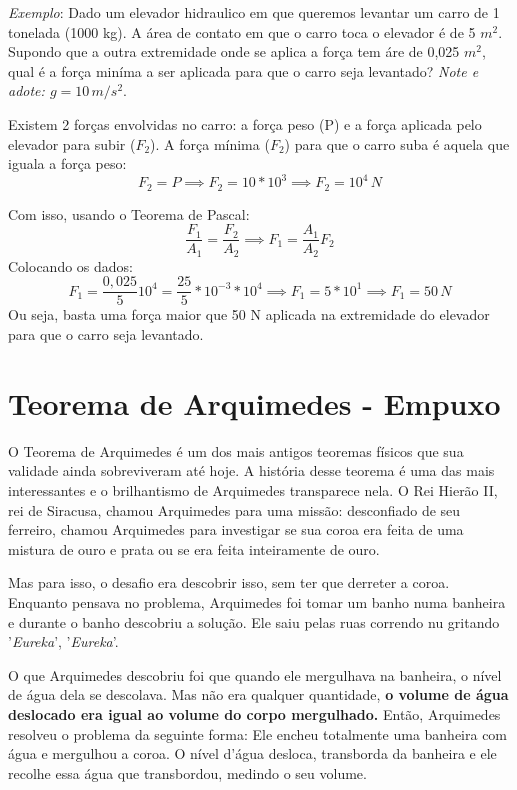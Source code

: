 \documentclass[12pt]{extarticle}
\newcommand{\<}{\langle}
\renewcommand{\>}{\rangle}
\theoremstyle{definition}
\begin{document}
\textit{Exemplo}: Dado um elevador hidraulico em que queremos levantar um carro de 1 tonelada (1000 kg). A área de contato em que o carro toca o elevador é de 5 $m^2$. Supondo que a outra extremidade onde se aplica a força tem áre de 0,025 $m^2$, qual é a força miníma a ser aplicada para que o carro seja levantado? \textit{Note e adote: $g=10\,m/s^2$}.

Existem 2 forças envolvidas no carro: a força peso (P) e a força aplicada pelo elevador para subir ($F_2$). A força mínima ($F_2$) para que o carro suba é aquela que iguala a força peso:
\begin{equation}
    F_2 = P \implies F_2 = 10*10^3 \implies F_2 = 10^4\, N
\end{equation}

Com isso, usando o Teorema de Pascal:
\begin{equation}
    \frac{F_1}{A_1} = \frac{F_2}{A_2} \implies F_1 = \frac{A_1}{A_2}F_2
\end{equation}
Colocando os dados:
\begin{equation}
    F_1 = \frac{0,025}{5}10^4 = \frac{25}{5}*10^{-3}*10^4 \implies F_1 = 5*10^1 \implies F_1 = 50\,N
\end{equation}
Ou seja, basta uma força maior que 50 N aplicada na extremidade do elevador para que o carro seja levantado.

\section{Teorema de Arquimedes - Empuxo}

O Teorema de Arquimedes é um dos mais antigos teoremas físicos que sua validade ainda sobreviveram até hoje. A história desse teorema é uma das mais interessantes e o brilhantismo de Arquimedes transparece nela. O Rei Hierão II, rei de Siracusa, chamou Arquimedes para uma missão: desconfiado de seu ferreiro, chamou Arquimedes para investigar se sua coroa era feita de uma mistura de ouro e prata ou se era feita inteiramente de ouro.

Mas para isso, o desafio era descobrir isso, sem ter que derreter a coroa. Enquanto pensava no problema, Arquimedes foi tomar um banho numa banheira e durante o banho descobriu a solução. Ele saiu pelas ruas correndo nu gritando '\textit{Eureka}', '\textit{Eureka}'.

O que Arquimedes descobriu foi que quando ele mergulhava na banheira, o nível de água dela se descolava. Mas não era qualquer quantidade, \textbf{o volume de água deslocado era igual ao volume do corpo mergulhado.} Então, Arquimedes resolveu o problema da seguinte forma: Ele encheu totalmente uma banheira com água e mergulhou a coroa. O nível d'água desloca, transborda da banheira e ele recolhe essa água que transbordou, medindo o seu volume.
\end{document}
